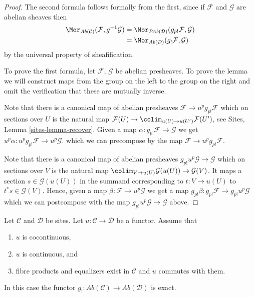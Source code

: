 \begin{proof}
The second formula follows formally from the first, since if
$\mathcal{F}$ and $\mathcal{G}$ are abelian sheaves then
\begin{align*}
\Mor_{\textit{Ab}(\mathcal{C})}(\mathcal{F}, g^{-1}\mathcal{G})
& =
\Mor_{\textit{PAb}(\mathcal{D})}(g_{p!}\mathcal{F}, \mathcal{G}) \\
& =
\Mor_{\textit{Ab}(\mathcal{D})}(g_!\mathcal{F}, \mathcal{G})
\end{align*}
by the universal property of sheafification.

\medskip\noindent
To prove the first formula, let $\mathcal{F}$, $\mathcal{G}$ be abelian
presheaves. To prove the lemma we will construct maps from the group on the
left to the group on the right and omit the verification that these are
mutually inverse.

\medskip\noindent
Note that there is a canonical map of abelian presheaves
$\mathcal{F} \to u^pg_{p!}\mathcal{F}$ which on sections over $U$ is the
natural map
$\mathcal{F}(U) \to \colim_{u(U) \to u(U')} \mathcal{F}(U')$, see
Sites, Lemma \ref{sites-lemma-recover}.
Given a map $\alpha : g_{p!}\mathcal{F} \to \mathcal{G}$
we get $u^p\alpha : u^pg_{p!}\mathcal{F} \to u^p\mathcal{G}$.
which we can precompose by the map $\mathcal{F} \to u^pg_{p!}\mathcal{F}$.

\medskip\noindent
Note that there is a canonical map of abelian presheaves
$g_{p!}u^p\mathcal{G} \to \mathcal{G}$ which on sections over
$V$ is the natural map
$\colim_{V \to u(U)} \mathcal{G}(u(U)) \to \mathcal{G}(V)$.
It maps a section $s \in \mathcal{G}(u(U))$ in the summand corresponding to
$t : V \to u(U)$ to $t^*s \in \mathcal{G}(V)$.
Hence, given a map $\beta : \mathcal{F} \to u^p\mathcal{G}$
we get a map $g_{p!}\beta : g_{p!}\mathcal{F} \to g_{p!}u^p\mathcal{G}$
which we can postcompose with the map $g_{p!}u^p\mathcal{G} \to \mathcal{G}$
above.
\end{proof}

\begin{lemma}
\label{lemma-exactness-lower-shriek}
Let $\mathcal{C}$ and $\mathcal{D}$ be sites.
Let $u : \mathcal{C} \to \mathcal{D}$ be a functor.
Assume that
\begin{enumerate}
\item[(a)] $u$ is cocontinuous,
\item[(b)] $u$ is continuous, and
\item[(c)] fibre products and equalizers exist in $\mathcal{C}$ and
$u$ commutes with them.
\end{enumerate}
In this case the functor
$g_! : \textit{Ab}(\mathcal{C}) \to \textit{Ab}(\mathcal{D})$
is exact.
\end{lemma}

